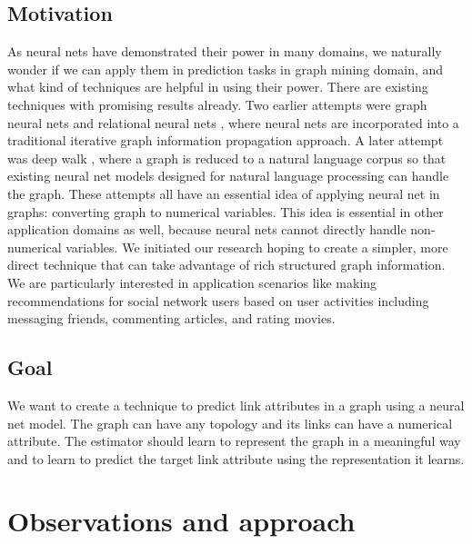 \documentclass{article}
\begin{document}
\subsection{Motivation}
As neural nets have demonstrated their power in many domains, we naturally 
wonder if we can apply them in prediction tasks in graph mining domain, and 
what kind of techniques are helpful in using their power.
There are existing techniques with promising results already.
Two earlier attempts were graph neural nets and relational neural 
nets \cite{scarselli2009graph}, where neural nets are incorporated into a 
traditional iterative graph information propagation approach.
A later attempt was deep walk \cite{perozzi2014deepwalk}, where a graph is 
reduced to a natural language corpus so that existing neural net models 
designed for natural language processing can handle the graph.
These attempts all have an essential idea of applying neural net in 
graphs: converting graph to numerical variables.
This idea is essential in other application domains as well, because neural 
nets cannot directly handle non-numerical variables.
We initiated our research hoping to create a simpler, more direct technique 
that can take advantage of rich structured graph information.
We are particularly interested in application scenarios like making 
recommendations for social network users based on user activities including 
messaging friends, commenting articles, and rating movies.

\subsection{Goal}
We want to create a technique to predict link attributes in a graph using a 
neural net model.
The graph can have any topology and its links can have a numerical attribute.
The estimator should learn to represent the graph in a meaningful way and to 
learn to predict the target link attribute using the representation it learns.

\section{Observations and approach}
\end{document}
